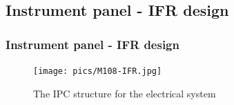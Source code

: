 \documentclass{beamer}
\begin{document}
\subsection{Instrument panel - IFR design}

\begin{frame}\frametitle{Instrument panel - IFR design}
\begin{figure}[ht!]
	\begin{center}
		\texttt{[image: pics/M108-IFR.jpg]}
		\caption{The IPC structure for the electrical system}
		\label{fig:PIC015}
	\end{center}
\end{figure}
\end{frame}





%
\end{document}

